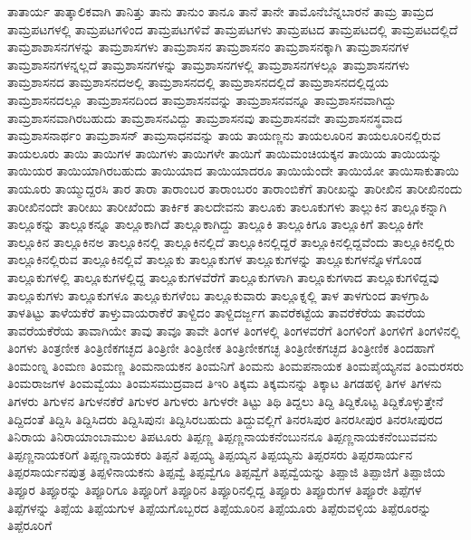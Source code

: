 {ತಾತಾರ್ಯ
ತಾತ್ಕಾಲಿಕವಾಗಿ
ತಾನಿತ್ತು
ತಾನು
ತಾನುಂ
ತಾನೂ
ತಾನೆ
ತಾನೇ
ತಾಮೊನೆಬೆನ್ನಬಾರನೆ
ತಾಮ್ರ
ತಾಮ್ರದ
ತಾಮ್ರಪಟಗಳಲ್ಲಿ
ತಾಮ್ರಪಟಗಳಿಂದ
ತಾಮ್ರಪಟಗಳಿವೆ
ತಾಮ್ರಪಟಗಳು
ತಾಮ್ರಪಟದ
ತಾಮ್ರಪಟದಲ್ಲಿ
ತಾಮ್ರಪಟದಲ್ಲಿದೆ
ತಾಮ್ರಶಾಶಾಸನಗಳನ್ನು
ತಾಮ್ರಶಾಸಗಳು
ತಾಮ್ರಶಾಸನ
ತಾಮ್ರಶಾಸನಂ
ತಾಮ್ರಶಾಸನಕ್ಕಾಗಿ
ತಾಮ್ರಶಾಸನಗಳ
ತಾಮ್ರಶಾಸನಗಳನ್ನಲ್ಲದೆ
ತಾಮ್ರಶಾಸನಗಳನ್ನು
ತಾಮ್ರಶಾಸನಗಳಲ್ಲಿ
ತಾಮ್ರಶಾಸನಗಳಲ್ಲೂ
ತಾಮ್ರಶಾಸನಗಳು
ತಾಮ್ರಶಾಸನದ
ತಾಮ್ರಶಾಸನದಅಲ್ಲಿ
ತಾಮ್ರಶಾಸನದಲ್ಲಿ
ತಾಮ್ರಶಾಸನದಲ್ಲಿದೆ
ತಾಮ್ರಶಾಸನದಲ್ಲಿದ್ದಯ
ತಾಮ್ರಶಾಸನದಲ್ಲೂ
ತಾಮ್ರಶಾಸನದಿಂದ
ತಾಮ್ರಶಾಸನವನ್ನು
ತಾಮ್ರಶಾಸನವನ್ನೂ
ತಾಮ್ರಶಾಸನವಾಗಿದ್ದು
ತಾಮ್ರಶಾಸನವಾಗಿರಬಹುದು
ತಾಮ್ರಶಾಸನವಿದ್ದು
ತಾಮ್ರಶಾಸನವು
ತಾಮ್ರಶಾಸನವೇ
ತಾಮ್ರಶಾಸನಸ್ಥವಾದ
ತಾಮ್ರಶಾಸನಾರ್ಥಂ
ತಾಮ್ರಶಾಸನ್
ತಾಮ್ರಸಾಧನವನ್ನು
ತಾಯ
ತಾಯಣ್ಣನು
ತಾಯಲೂರಿನ
ತಾಯಲೂರಿನಲ್ಲಿರುವ
ತಾಯಲೂರು
ತಾಯಿ
ತಾಯಿಗಳ
ತಾಯಿಗಳು
ತಾಯಿಗಳೇ
ತಾಯಿಗೆ
ತಾಯಿಮಂಚಿಯಕ್ಕನ
ತಾಯಿಯ
ತಾಯಿಯನ್ನು
ತಾಯಿಯರ
ತಾಯಿಯಾಗಿರಬಹುದು
ತಾಯಿಯಾದ
ತಾಯಿಯಾದರೂ
ತಾಯಿಯೆಂದೇ
ತಾಯಿಯೋ
ತಾಯಿಸಾಕುತಾಯಿ
ತಾಯೂರು
ತಾಯ್ಮುದ್ದರಸಿ
ತಾರ
ತಾರಾ
ತಾರಾಂಬರ
ತಾರಾಂಬರಂ
ತಾರಾಂಬಿಕೆಗೆ
ತಾರೀಖನ್ನು
ತಾರೀಖಿನ
ತಾರೀಖಿನಂದು
ತಾರೀಖಿನಂದೇ
ತಾರೀಖು
ತಾರೀಖೆಂದು
ತಾರ್ಕಿಕ
ತಾಲದೇವನು
ತಾಲೂಕು
ತಾಲೂಕುಗಳು
ತಾಲ್ಲುಕಿನ
ತಾಲ್ಲೂಕನ್ನಾಗಿ
ತಾಲ್ಲೂಕನ್ನು
ತಾಲ್ಲೂಕನ್ನೂ
ತಾಲ್ಲೂಕಾಗಿದೆ
ತಾಲ್ಲೂಕಾಗಿದ್ದು
ತಾಲ್ಲೂಕಿ
ತಾಲ್ಲೂಕಿಗೂ
ತಾಲ್ಲೂಕಿಗೆ
ತಾಲ್ಲೂಕಿಗೇ
ತಾಲ್ಲೂಕಿನ
ತಾಲ್ಲೂಕಿನಅ
ತಾಲ್ಲೂಕಿನಲ್ಲಿ
ತಾಲ್ಲೂಕಿನಲ್ಲಿದೆ
ತಾಲ್ಲೂಕಿನಲ್ಲಿದ್ದರೆ
ತಾಲ್ಲೂಕಿನಲ್ಲಿದ್ದವೆಂದು
ತಾಲ್ಲೂಕಿನಲ್ಲಿರು
ತಾಲ್ಲೂಕಿನಲ್ಲಿರುವ
ತಾಲ್ಲೂಕಿನಲ್ಲಿವೆ
ತಾಲ್ಲೂಕು
ತಾಲ್ಲೂಕುಗಳ
ತಾಲ್ಲೂಕುಗಳನ್ನು
ತಾಲ್ಲೂಕುಗಳನ್ನೊಳಗೊಂಡ
ತಾಲ್ಲೂಕುಗಳಲ್ಲಿ
ತಾಲ್ಲೂಕುಗಳಲ್ಲಿದ್ದ
ತಾಲ್ಲೂಕುಗಳವೆರೆಗೆ
ತಾಲ್ಲೂಕುಗಳಾಗಿ
ತಾಲ್ಲೂಕುಗಳಾದ
ತಾಲ್ಲೂಕುಗಳಿದ್ದವು
ತಾಲ್ಲೂಕುಗಳು
ತಾಲ್ಲೂಕುಗಳೂ
ತಾಲ್ಲೂಕುಗಳೆಂಬ
ತಾಲ್ಲೂಕುವಾರು
ತಾಲ್ಲೂಕ್ನಲ್ಲಿ
ತಾಳ
ತಾಳಗುಂದ
ತಾಳಗ್ರಾಹಿ
ತಾಳತಿಟ್ಟು
ತಾಳೆಯಕೆರೆ
ತಾಳ್ತುವಾಯರಾಕೆರೆ
ತಾಳ್ದಿದಂ
ತಾಳ್ದಿದರ್ಜ್ಜಗ
ತಾವರೆಕಟ್ಟೆಯ
ತಾವರೆಕೆರೆಯ
ತಾವರೆಯ
ತಾವರೆಯಕೆರೆಯ
ತಾವಾಗಿಯೇ
ತಾವು
ತಾವೂ
ತಾವೇ
ತಿಂಗಳ
ತಿಂಗಳಲ್ಲಿ
ತಿಂಗಳವರೆಗೆ
ತಿಂಗಳಿಂಗೆ
ತಿಂಗಳಿಗೆ
ತಿಂಗಳಿನಲ್ಲಿ
ತಿಂಗಳು
ತಿಂತ್ರಣೀಕ
ತಿಂತ್ರಿಣಿಕಗಚ್ಛದ
ತಿಂತ್ರಿಣೀ
ತಿಂತ್ರಿಣೀಕ
ತಿಂತ್ರಿಣೀಕಗಚ್ಛ
ತಿಂತ್ರಿಣೀಕಗಚ್ಛದ
ತಿಂತ್ರೀಣಿಕ
ತಿಂದಹಾಗೆ
ತಿಂಮಂಣ್ನ
ತಿಂಮಣ
ತಿಂಮಣ್ಣ
ತಿಂಮನಾಯಕನ
ತಿಂಮನಿಗೆ
ತಿಂಮನು
ತಿಂಮಪನಾಯಕ
ತಿಂಮಪೈಯ್ಯನವ
ತಿಂಮರಸರು
ತಿಂಮರಾಜಗಳ
ತಿಂಮವ್ವೆಯು
ತಿಂಮಸಮುದ್ರವಾದ
ತಿಇರಿ
ತಿಕ್ಕಮ
ತಿಕ್ಕಮನನ್ನು
ತಿಕ್ಕಾಟ
ತಿಗಡಹಳ್ಳಿ
ತಿಗಳ
ತಿಗಳನು
ತಿಗಳರು
ತಿಗುಳನ
ತಿಗುಳನಕೆರೆ
ತಿಗುಳರ
ತಿಗುಳರು
ತಿಗುಳರೇ
ತಿಟ್ಟು
ತಿಥಿ
ತಿದ್ದಲು
ತಿದ್ದಿ
ತಿದ್ದಿಕೊಟ್ಟ
ತಿದ್ದಿಕೊಳ್ಳುತ್ತೇನೆ
ತಿದ್ದಿದಂತೆ
ತಿದ್ದಿಸಿ
ತಿದ್ದಿಸಿದರು
ತಿದ್ದಿಸಿಪುನಃ
ತಿದ್ದಿಸಿರಬಹುದು
ತಿದ್ದುವಲ್ಲಿಗೆ
ತಿನರಸಿಪುರ
ತಿನರಸೀಪುರ
ತಿನರಸೀಪುರದ
ತಿನಿರಾಯ
ತಿನಿರಾಯಾಂಬಾಮುಲ
ತಿಪಟೂರು
ತಿಪ್ಪಣ್ಣ
ತಿಪ್ಪಣ್ಣನಾಯಕನೆಂಬುನನೂ
ತಿಪ್ಪಣ್ಣನಾಯಕನೆಂಬುವವನು
ತಿಪ್ಪಣ್ಣನಾಯಕರಿಗೆ
ತಿಪ್ಪಣ್ಣನಾಯಕರು
ತಿಪ್ಪನೆ
ತಿಪ್ಪಯ್ಯ
ತಿಪ್ಪಯ್ಯನ
ತಿಪ್ಪಯ್ಯನು
ತಿಪ್ಪರಸರು
ತಿಪ್ಪರಸಾರ್ಯನ
ತಿಪ್ಪರಸಾರ್ಯನಪುತ್ರ
ತಿಪ್ಪಳಿನಾಯಕನು
ತಿಪ್ಪವ್ವೆ
ತಿಪ್ಪವ್ವೆಗೂ
ತಿಪ್ಪವ್ವೆಗೆ
ತಿಪ್ಪವ್ವೆಯನ್ನು
ತಿಪ್ಪಾಜಿ
ತಿಪ್ಪಾಜಿಗೆ
ತಿಪ್ಪಾಜಿಯ
ತಿಪ್ಪೂರ
ತಿಪ್ಪೂರನ್ನು
ತಿಪ್ಪೂರಿಗೂ
ತಿಪ್ಪೂರಿಗೆ
ತಿಪ್ಪೂರಿನ
ತಿಪ್ಪೂರಿನಲ್ಲಿದ್ದ
ತಿಪ್ಪೂರು
ತಿಪ್ಪೂರುಗಳ
ತಿಪ್ಪೂರೇ
ತಿಪ್ಪೆಗಳ
ತಿಪ್ಪೆಗಳನ್ನು
ತಿಪ್ಪೆಯ
ತಿಪ್ಪೆಯಗುಳ
ತಿಪ್ಪೆಯಗೊಬ್ಬರದ
ತಿಪ್ಪೆಯೂರಿನ
ತಿಪ್ಪೆಯೂರು
ತಿಪ್ಪೆರುವಳ್ಳಿಯ
ತಿಪ್ಪೆರೂರನ್ನು
ತಿಪ್ಪೆರೂರಿಗೆ
}
